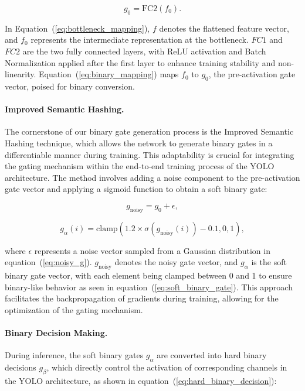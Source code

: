 \begin{equation}
g_0 = \text{FC2}(f_0).
\label{eq:binary_mapping}
\end{equation}

In Equation~(\ref{eq:bottleneck_mapping}), \(f\) denotes the flattened feature vector, and \(f_0\) represents the intermediate representation at the bottleneck. \(FC1\) and \(FC2\) are the two fully connected layers, with ReLU activation and Batch Normalization applied after the first layer to enhance training stability and non-linearity. Equation~(\ref{eq:binary_mapping}) maps \(f_0\) to \(g_0\), the pre-activation gate vector, poised for binary conversion.

\paragraph{Improved Semantic Hashing.} The cornerstone of our binary gate generation process is the Improved Semantic Hashing technique, which allows the network to generate binary gates in a differentiable manner during training. This adaptability is crucial for integrating the gating mechanism within the end-to-end training process of the YOLO architecture. The method involves adding a noise component to the pre-activation gate vector and applying a sigmoid function to obtain a soft binary gate:

\begin{equation}
g_{\text{noisy}} = g_0 + \epsilon,
\label{eq:noisy_g}
\end{equation}

\begin{equation}
g_{\alpha}(i) = \text{clamp}(1.2 \times \sigma(g_{\text{noisy}}(i)) - 0.1, 0, 1),
\label{eq:soft_binary_gate}
\end{equation}

where \(\epsilon\) represents a noise vector sampled from a Gaussian distribution in equation~(\ref{eq:noisy_g}). \(g_{\text{noisy}}\) denotes the noisy gate vector, and \(g_{\alpha}\) is the soft binary gate vector, with each element being clamped between 0 and 1 to ensure binary-like behavior as seen in equation~(\ref{eq:soft_binary_gate}). This approach facilitates the backpropagation of gradients during training, allowing for the optimization of the gating mechanism.

\paragraph{Binary Decision Making.} During inference, the soft binary gates \(g_{\alpha}\) are converted into hard binary decisions \(g_{\beta}\), which directly control the activation of corresponding channels in the YOLO architecture, as shown in equation~(\ref{eq:hard_binary_decision}):

